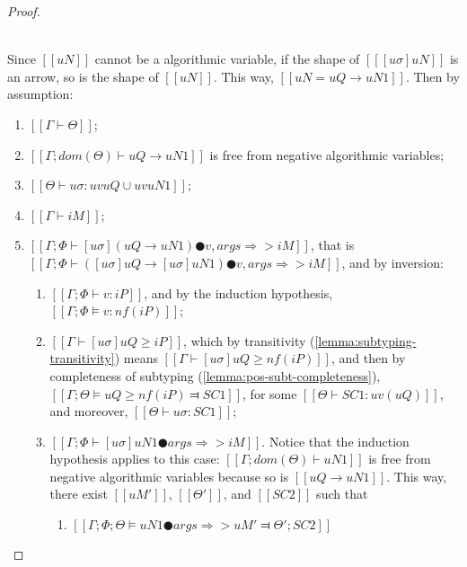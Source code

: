 \begin{proof}
\begin{caseof}
        \item {}\\
            Since $[[uN]]$ cannot be a algorithmic variable,  
            if the shape of $[[ [uσ]uN ]]$ is an arrow, 
            so is the shape of $[[uN]]$. This way, 
            $[[uN = uQ → uN1]]$.
            Then by assumption:
            \begin{enumerate}
                \item $[[Γ ⊢ Θ]]$;
                \item $[[Γ; dom(Θ) ⊢  uQ → uN1]]$ is free from negative algorithmic variables;
                \item $[[Θ ⊢ uσ : uv uQ ∪ uv uN1]]$;
                \item $[[Γ ⊢ iM]]$;
                \item $[[Γ; Φ ⊢ [uσ](uQ → uN1) ● v, args ⇒> iM]]$, 
                    \label{point:typing-completeness-arrow-app-inversion}
                    that is $[[Γ; Φ ⊢ ([uσ]uQ → [uσ]uN1) ● v, args ⇒> iM]]$,
                    and by inversion:
                    \begin{enumerate}
                        \item $[[Γ; Φ ⊢ v : iP]]$,
                            and by the induction hypothesis, 
                            $[[Γ; Φ ⊨ v : nf(iP)]]$;
                        \item $[[Γ ⊢ [uσ]uQ ≥ iP]]$, 
                            which by transitivity (\cref{lemma:subtyping-transitivity}) means 
                            $[[Γ ⊢ [uσ]uQ ≥ nf(iP)]]$,
                            and then by completeness of subtyping 
                            (\cref{lemma:pos-subt-completeness}),
                            $[[ Γ; Θ ⊨ uQ ≥ nf(iP) ⫤ SC1 ]]$, 
                            for some $[[Θ ⊢ SC1 : uv(uQ)]]$, and moreover, $[[ Θ ⊢ uσ : SC1 ]]$;
                        \item $[[Γ; Φ ⊢ [uσ]uN1 ● args ⇒> iM]]$. 
                            \label{point:completeness-arrow-app-ih}
                            Notice that the induction hypothesis applies to this case:
                            $[[Γ ; dom(Θ) ⊢  uN1]]$ is free from negative algorithmic variables because
                            so is $[[uQ → uN1]]$. This way, there exist 
                            $[[uM']]$, $[[Θ']]$, and $[[SC2]]$ such that 
                            \begin{enumerate}
                                \item $[[ Γ; Φ; Θ ⊨ uN1 ● args ⇒> uM' ⫤ Θ'; SC2 ]]$

\end{enumerate}
\end{enumerate}
\end{enumerate}
\end{caseof}
\end{proof}
